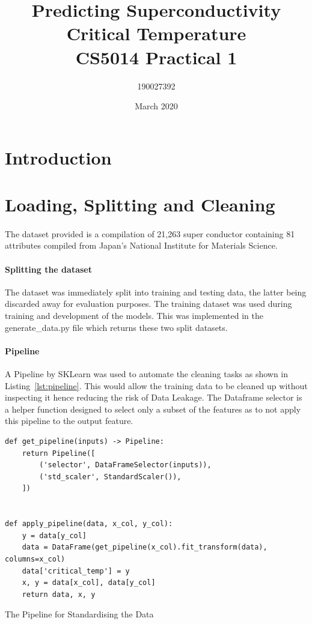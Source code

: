 \documentclass{article}
\title{Predicting Superconductivity Critical Temperature\\
\large CS5014 Practical 1}
\author{190027392}
\date{March 2020}
\begin{document}
\maketitle
\newpage
\tableofcontents
\listoffigures
\listoftables
\listoflistings
\newpage

\section{Introduction}
\section{Loading, Splitting and Cleaning}
\paragraph{} The dataset provided is a compilation of 21,263 super conductor containing 81 attributes compiled from Japan’s National Institute for Materials Science. 
\paragraph{Splitting the dataset} The dataset was immediately split into training and testing data, the latter being discarded away for evaluation purposes. The training dataset was used during training and development of the models. This was implemented in the generate\_data.py file which returns these two split datasets.
\label{section:pipeline}
\paragraph{Pipeline} A Pipeline by SKLearn was used to automate the cleaning tasks as shown in Listing~\ref{lst:pipeline}. This would allow the training data to be cleaned up without inspecting it hence reducing the risk of Data Leakage. The Dataframe selector is a helper function designed to select only a subset of the features as to not apply this pipeline to the output feature.

\begin{listing}[ht]
\label{lst:pipeline}
\begin{verbatim}
def get_pipeline(inputs) -> Pipeline:
    return Pipeline([
        ('selector', DataFrameSelector(inputs)),
        ('std_scaler', StandardScaler()),
    ])


def apply_pipeline(data, x_col, y_col):
    y = data[y_col]
    data = DataFrame(get_pipeline(x_col).fit_transform(data), columns=x_col)
    data['critical_temp'] = y
    x, y = data[x_col], data[y_col]
    return data, x, y
\end{verbatim}
\caption{The Pipeline for Standardising the Data}
\end{listing}{}
\end{document}
